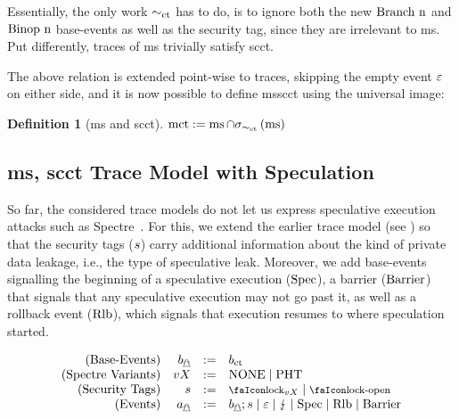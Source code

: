 \documentclass[dvipsnames,conference]{IEEEtran}
\theoremstyle{definition}
\newtheorem{definition}{Definition}[section]
\begin{document}
Essentially, the only work $\sim_{\operatorname{ct}}$ has to do, is to ignore both the new $\text{Branch\ n}$ and $\text{Binop\ n}$ base-events as well as the security tag, since they are irrelevant to \gls*{ms}.
Put differently, traces of \gls*{ms} trivially satisfy \gls*{scct}.

The above relation is extended point-wise to traces, skipping the empty event $\varepsilon$ on either side, and it is now possible to define \gls*{msscct} using the universal image:

\begin{definition}[\gls*{ms} and \gls*{scct}]\label{def:trace:msscctdef}
  $
  \operatorname{mct}:=\operatorname{ms}\cap\sigma_{\sim_{\operatorname{ct}}}\left(\operatorname{ms}\right)
  $
\end{definition}

\subsection{\gls*{ms}, \gls*{scct} Trace Model with Speculation}\label{subsec:msctss:tracemodel}

So far, the considered trace models do not let us express speculative execution attacks such as Spectre~\cite{kocher2019spectre}. 
For this, we extend the earlier trace model (see ) so that the security tags ($s$) carry additional information about the kind of private data leakage, i.e., the type of speculative leak.
Moreover, we add base-events signalling the beginning of a speculative execution ($\text{Spec}$), a barrier ($\text{Barrier}$) that signals that any speculative execution may not go past it, as well as a rollback event ($\text{Rlb}$), which signals that execution resumes to where speculation started.

\vspace{-1em}
{
\[
  \begin{array}{rrcl}
    (\text{Base-Events}) & \preevent[_{\mathghost}] &:=& \preevent[_{\ctsafe}] \\
    (\text{Spectre Variants}) & vX &:=& \operatorname{NONE} \mid \operatorname{PHT} \\
    (\text{Security Tags}) & \securitytag &:=& \lock_{vX} \mid \unlock\\ 
    (\text{Events}) & \event[_{\mathghost}] &:=& \preevent[_{\mathghost}];\securitytag \mid \emptyevent \mid \lightning \mid \ev{Spec} \mid \ev{Rlb} \mid \ev{Barrier}\\ 
  \end{array}
\]
}
\end{document}
